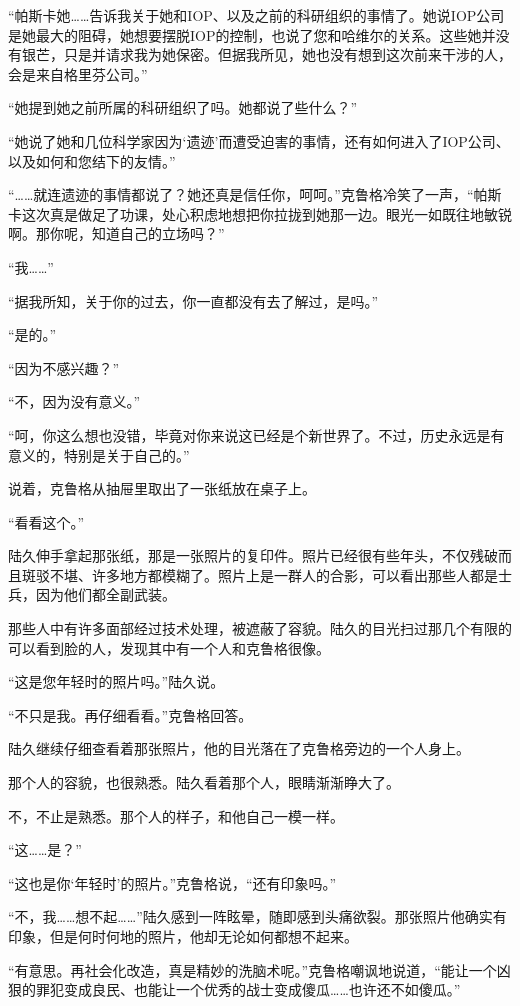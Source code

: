 “帕斯卡她……告诉我关于她和IOP、以及之前的科研组织的事情了。她说IOP公司是她最大的阻碍，她想要摆脱IOP的控制，也说了您和哈维尔的关系。这些她并没有银芒，只是并请求我为她保密。但据我所见，她也没有想到这次前来干涉的人，会是来自格里芬公司。”

“她提到她之前所属的科研组织了吗。她都说了些什么？”

“她说了她和几位科学家因为‘遗迹’而遭受迫害的事情，还有如何进入了IOP公司、以及如何和您结下的友情。”

“……就连遗迹的事情都说了？她还真是信任你，呵呵。”克鲁格冷笑了一声，“帕斯卡这次真是做足了功课，处心积虑地想把你拉拢到她那一边。眼光一如既往地敏锐啊。那你呢，知道自己的立场吗？”

“我……”

“据我所知，关于你的过去，你一直都没有去了解过，是吗。”

“是的。”

“因为不感兴趣？”

“不，因为没有意义。”

“呵，你这么想也没错，毕竟对你来说这已经是个新世界了。不过，历史永远是有意义的，特别是关于自己的。”

说着，克鲁格从抽屉里取出了一张纸放在桌子上。

“看看这个。”

陆久伸手拿起那张纸，那是一张照片的复印件。照片已经很有些年头，不仅残破而且斑驳不堪、许多地方都模糊了。照片上是一群人的合影，可以看出那些人都是士兵，因为他们都全副武装。

那些人中有许多面部经过技术处理，被遮蔽了容貌。陆久的目光扫过那几个有限的可以看到脸的人，发现其中有一个人和克鲁格很像。

“这是您年轻时的照片吗。”陆久说。

“不只是我。再仔细看看。”克鲁格回答。

陆久继续仔细查看着那张照片，他的目光落在了克鲁格旁边的一个人身上。

那个人的容貌，也很熟悉。陆久看着那个人，眼睛渐渐睁大了。

不，不止是熟悉。那个人的样子，和他自己一模一样。

“这……是？”

“这也是你‘年轻时’的照片。”克鲁格说，“还有印象吗。”

“不，我……想不起……”陆久感到一阵眩晕，随即感到头痛欲裂。那张照片他确实有印象，但是何时何地的照片，他却无论如何都想不起来。

“有意思。再社会化改造，真是精妙的洗脑术呢。”克鲁格嘲讽地说道，“能让一个凶狠的罪犯变成良民、也能让一个优秀的战士变成傻瓜……也许还不如傻瓜。”

